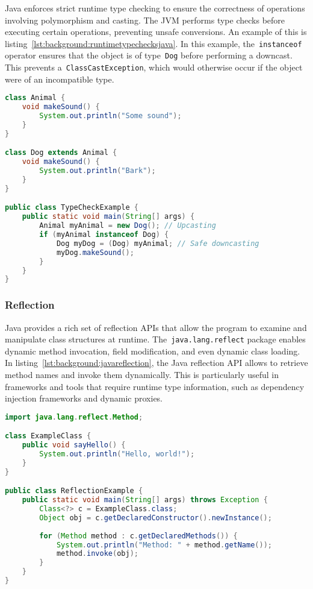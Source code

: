 Java enforces strict runtime type checking to ensure the correctness of operations involving polymorphism and casting. The JVM performs type checks before executing certain operations, preventing unsafe conversions. An example of this is listing~\ref{lst:background:runtimetypechecksjava}. In this example, the~\lstinline|instanceof| operator ensures that the object is of type~\lstinline|Dog| before performing a downcast. This prevents a~\lstinline|ClassCastException|, which would otherwise occur if the object were of an incompatible type.


\begin{lstlisting}[language=Java,caption=Runtime typechecks in Java,label=lst:background:runtimetypechecksjava]
class Animal {
	void makeSound() {
		System.out.println("Some sound");
	}
}

class Dog extends Animal {
	void makeSound() {
		System.out.println("Bark");
	}
}

public class TypeCheckExample {
	public static void main(String[] args) {
		Animal myAnimal = new Dog(); // Upcasting
		if (myAnimal instanceof Dog) {
			Dog myDog = (Dog) myAnimal; // Safe downcasting
			myDog.makeSound();
		}
	}
}
\end{lstlisting}

\subsubsection{Reflection}

Java provides a rich set of reflection APIs that allow the program to examine and manipulate class structures at runtime. The~\lstinline|java.lang.reflect| package enables dynamic method invocation, field modification, and even dynamic class loading. In listing~\ref{lst:background:javareflection}, the Java reflection API allows to retrieve method names and invoke them dynamically. This is particularly useful in frameworks and tools that require runtime type information, such as dependency injection frameworks and dynamic proxies.

\begin{lstlisting}[language=Java,caption=Reflection in Java,label=lst:background:javareflection]
import java.lang.reflect.Method;

class ExampleClass {
	public void sayHello() {
		System.out.println("Hello, world!");
	}
}

public class ReflectionExample {
	public static void main(String[] args) throws Exception {
		Class<?> c = ExampleClass.class;
		Object obj = c.getDeclaredConstructor().newInstance();
		
		for (Method method : c.getDeclaredMethods()) {
			System.out.println("Method: " + method.getName());
			method.invoke(obj);
		}
	}
}
\end{lstlisting}

